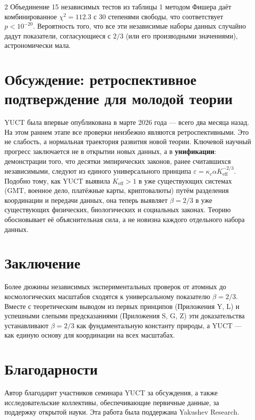 \documentclass[11pt,a4paper]{article}
\newcommand{\betaf}{\beta}
\begin{document}
\begin{multicols}{2}
		Объединение 15 независимых тестов из таблицы 1 методом Фишера даёт комбинированное \(\chi^2 = 112.3\) с 30 степенями свободы, что соответствует \(p < 10^{-20}\). Вероятность того, что все эти независимые наборы данных случайно дадут показатели, согласующиеся с \(2/3\) (или его производными значениями), астрономически мала.
		
		\section{Обсуждение: ретроспективное подтверждение для молодой теории}
		
		YUCT была впервые опубликована в марте 2026 года — всего два месяца назад. На этом раннем этапе все проверки неизбежно являются ретроспективными. Это не слабость, а нормальная траектория развития новой теории. Ключевой научный прогресс заключается не в открытии новых данных, а в \textbf{унификации}: демонстрации того, что десятки эмпирических законов, ранее считавшихся независимыми, следуют из единого универсального принципа \(\varepsilon = \kappa_c \alpha K_{\mathrm{eff}}^{-2/3}\). Подобно тому, как YUCT выявила \(K_{\mathrm{eff}} > 1\) в уже существующих системах (GMT, военное дело, платёжные карты, криптовалюты) путём разделения координации и передачи данных, она теперь выявляет \(\beta = 2/3\) в уже существующих физических, биологических и социальных законах. Теорию обосновывает её объяснительная сила, а не новизна каждого отдельного набора данных.
		
		\section{Заключение}
		
		Более дюжины независимых экспериментальных проверок от атомных до космологических масштабов сходятся к универсальному показателю \(\betaf = 2/3\). Вместе с теоретическим выводом из первых принципов (Приложения Y, L) и успешными слепыми предсказаниями (Приложения S, G, Z) эти доказательства устанавливают \(\betaf = 2/3\) как фундаментальную константу природы, а YUCT — как единую основу для координации на всех масштабах.
		
		\section*{Благодарности}
		
		Автор благодарит участников семинара YUCT за обсуждения, а также исследовательские коллективы, обеспечивающие первичные данные, за поддержку открытой науки. Эта работа была поддержана Yakushev Research.
		

\end{multicols}
\end{document}
